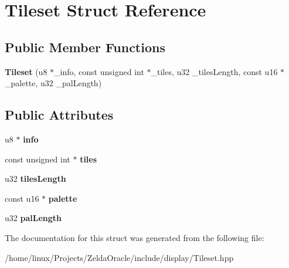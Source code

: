 \hypertarget{structTileset}{\section{Tileset Struct Reference}
\label{structTileset}
}
\subsection*{Public Member Functions}
\begin{DoxyCompactItemize}
\item 
\hypertarget{structTileset_a07a467452269b180d9648b8654ed4360}{{\bfseries Tileset} (u8 $\ast$\+\_\+info, const unsigned int $\ast$\+\_\+tiles, u32 \+\_\+tiles\+Length, const u16 $\ast$\+\_\+palette, u32 \+\_\+pal\+Length)}\label{structTileset_a07a467452269b180d9648b8654ed4360}

\end{DoxyCompactItemize}
\subsection*{Public Attributes}
\begin{DoxyCompactItemize}
\item 
\hypertarget{structTileset_acc283d7b507dd0c2fbd569adc5bdefc6}{u8 $\ast$ {\bfseries info}}\label{structTileset_acc283d7b507dd0c2fbd569adc5bdefc6}

\item 
\hypertarget{structTileset_a287ee4f9016e47dd67a93a8737b7ec75}{const unsigned int $\ast$ {\bfseries tiles}}\label{structTileset_a287ee4f9016e47dd67a93a8737b7ec75}

\item 
\hypertarget{structTileset_a4b2815f4c044a8a0a664d469f11286bf}{u32 {\bfseries tiles\+Length}}\label{structTileset_a4b2815f4c044a8a0a664d469f11286bf}

\item 
\hypertarget{structTileset_a1070f3d36c53f86ad5f42ddd2722c595}{const u16 $\ast$ {\bfseries palette}}\label{structTileset_a1070f3d36c53f86ad5f42ddd2722c595}

\item 
\hypertarget{structTileset_a038d33e6acfee0ec6c69e450232fd427}{u32 {\bfseries pal\+Length}}\label{structTileset_a038d33e6acfee0ec6c69e450232fd427}

\end{DoxyCompactItemize}


The documentation for this struct was generated from the following file\+:\begin{DoxyCompactItemize}
\item 
/home/linux/\+Projects/\+Zelda\+Oracle/include/display/Tileset.\+hpp\end{DoxyCompactItemize}
